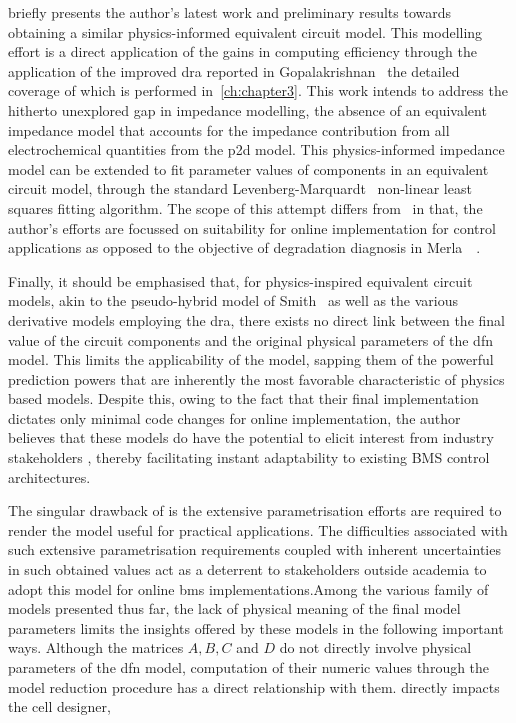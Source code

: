   briefly presents  the author's  latest work  and preliminary
results towards  obtaining a similar physics-informed  equivalent circuit model.
This  modelling  effort is  a  direct  application  of  the gains  in  computing
efficiency  through   the  application   of  the  improved   \gls{dra}  reported
in  Gopalakrishnan\etal{}~\cite{Gopalakrishnan2017}  the  detailed  coverage  of
which  is performed  in~\cref{ch:chapter3}.  This work  intends  to address  the
hitherto  unexplored  gap  in  impedance  modelling, \ie{}  the  absence  of  an
equivalent  impedance  model  that   accounts  for  the  impedance  contribution
from   all   electrochemical  quantities   from   the   \gls{p2d}  model.   This
physics-informed  impedance  model  can  be extended  to  fit  parameter  values
of  components  in an  equivalent  circuit  model,  \eg{} through  the  standard
Levenberg-Marquardt~\cite{Levenberg1944, Marquardt1963} non-linear least squares
fitting algorithm.  The scope of  this attempt differs  from~\cite{Merla2018} in
that, the author's efforts are focussed on suitability for online implementation
for control applications as opposed to the objective of degradation diagnosis in
Merla~\etal~\cite{Merla2018}.

Finally, it should  be emphasised that, for  physics-inspired equivalent circuit
models, akin to the pseudo-hybrid model  of Smith~\etal{} as well as the various
derivative models employing  the \gls{dra}, there exists no  direct link between
the final value  of the circuit components and the  original physical parameters
of the \gls{dfn} model. This limits the applicability of the model, sapping them
of  the  powerful prediction  powers  that  are  inherently the  most  favorable
characteristic of  physics based models.  Despite this,  owing to the  fact that
their  final  implementation  dictates  only minimal  code  changes  for  online
implementation, the author  believes that these models do have  the potential to
elicit  interest  from  industry  stakeholders ,  thereby  facilitating  instant
adaptability to existing BMS control architectures.

The  singular   drawback  of     is   the  extensive
parametrisation efforts are required  to  render the model useful  for practical
applications. The  difficulties associated  with such  extensive parametrisation
requirements coupled with inherent uncertainties  in such obtained values act as
a deterrent  to stakeholders  outside academia  to adopt  this model  for online
\gls{bms} implementations.Among the various family of models presented thus far,
the lack of  physical meaning of the final model  parameters limits the insights
offered by these  models in the following important ways.  Although the matrices
$A, B, C$ and  $D$ do not directly involve physical  parameters of the \gls{dfn}
model, computation of their numeric values through the model reduction procedure
has a direct relationship with them. directly impacts the cell designer,

